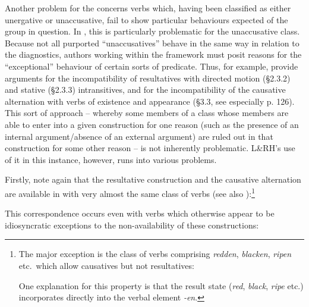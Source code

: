 \documentclass[output=paper]{langsci/langscibook}
\begin{document}
Another problem for the  concerns verbs which, having
been classified as either unergative or unaccusative, fail to show particular
behaviours expected of the group in question. In , this is particularly
problematic for the unaccusative class. Because not all purported
\enquote{unaccusatives} behave in the same way in relation to the diagnostics,
authors working within the  framework must posit reasons
for the \enquote{exceptional} behaviour of certain sorts of predicate. Thus,
for example, \citet{LevinRappaportHovav1995} provide arguments for the
incompatibility of resultatives with directed motion (§2.3.2) and stative
(§2.3.3) intransitives, and for the incompatibility of the causative
alternation with verbs of existence and appearance (§3.3, see especially p.
126). This sort of approach – whereby some members of a class whose members are
able to enter into a given construction for one reason (such as the presence of
an internal argument\slash absence of an external argument) are ruled out in that
construction for some other reason – is not inherently problematic. L\&RH’s
use of it in this instance, however, runs into various problems.

Firstly, note again that the resultative construction and the causative
alternation are available in  with very almost the same class of verbs
(see also \citealt{Baker2018,Baker2019}):\footnote{The major exception is the
    class of verbs comprising \emph{redden}, \emph{blacken}, \emph{ripen} etc.\
    which allow causatives but not resultatives:

\z

One explanation for this property is that the result state (\emph{red},
\emph{black}, \emph{ripe} etc.) incorporates directly into the verbal element
\emph{-en}.}

\ea
    \z
\ex
    \z
\z
This correspondence occurs even with verbs which otherwise appear to be
idiosyncratic exceptions to the non-availability of these
constructions:
\end{document}
